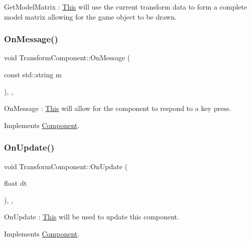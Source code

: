 Get\+Model\+Matrix \+: \mbox{\hyperlink{class_this}{This}} will use the current transform data to form a complete model matrix allowing for the game object to be drawn. \mbox{\label{class_transform_component_ac250c4b7e47e639d0f8693d04c9b5051}} 
\subsubsection{\texorpdfstring{On\+Message()}{OnMessage()}}
{\footnotesize\ttfamily void Transform\+Component\+::\+On\+Message (\begin{DoxyParamCaption}\item[{const std\+::string}]{m }\end{DoxyParamCaption})\hspace{0.3cm}{\ttfamily [inline]}, {\ttfamily [override]}, {\ttfamily [virtual]}}

On\+Message \+: \mbox{\hyperlink{class_this}{This}} will allow for the component to respond to a key press. 

Implements \mbox{\hyperlink{class_component_a1a880fe5e212cd7ef8241e220660417d}{Component}}.

\mbox{\label{class_transform_component_ab763f5af77fcb5eee0e725c219901fa3}} 
\subsubsection{\texorpdfstring{On\+Update()}{OnUpdate()}}
{\footnotesize\ttfamily void Transform\+Component\+::\+On\+Update (\begin{DoxyParamCaption}\item[{float}]{dt }\end{DoxyParamCaption})\hspace{0.3cm}{\ttfamily [inline]}, {\ttfamily [override]}, {\ttfamily [virtual]}}

On\+Update \+: \mbox{\hyperlink{class_this}{This}} will be used to update this component. 

Implements \mbox{\hyperlink{class_component_ab71d7f4b6d8792287a9b0c9e045acbe0}{Component}}.

